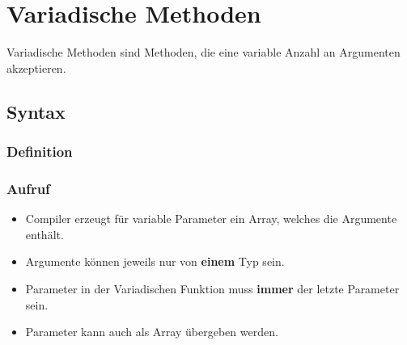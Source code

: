 \section{Variadische Methoden}
Variadische Methoden sind Methoden, die eine variable Anzahl an Argumenten akzeptieren.
\subsection{Syntax}
\vspace{-0.8\abovedisplayskip}
\begin{minipage}[t]{0.49\columnwidth}
    \subsubsection{Definition}
    
\end{minipage}\hfill
\begin{minipage}[t]{0.49\columnwidth}
    \subsubsection{Aufruf}
    
\end{minipage}
\begin{itemize}
    \item Compiler erzeugt für variable Parameter ein Array, welches die Argumente enthält.
    \item Argumente können jeweils nur von \textbf{einem} Typ sein.
    \item Parameter in der Variadischen Funktion muss \textbf{immer} der letzte Parameter sein.
    \item Parameter kann auch als Array übergeben werden.
\end{itemize}